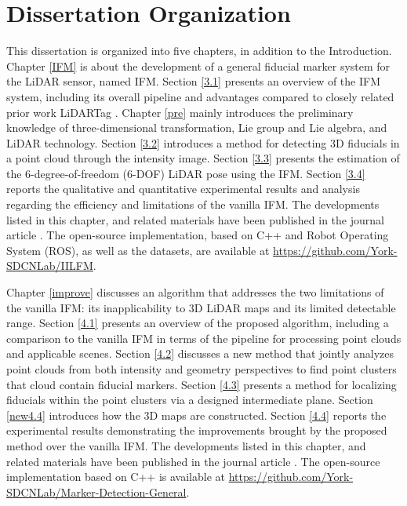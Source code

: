 \section{Dissertation Organization}
This dissertation is organized into five chapters, in addition to the Introduction.
%
Chapter \ref{IFM} is about the development of a general fiducial marker system for the LiDAR sensor, named IFM. Section \ref{3.1} presents an overview of the IFM system, including its overall pipeline and advantages compared to closely related prior work LiDARTag \cite{lt}. Chapter \ref{pre} mainly introduces the preliminary knowledge of three-dimensional transformation, Lie group and Lie algebra, and LiDAR technology. Section \ref{3.2} introduces a method for detecting 3D fiducials in a point cloud through the intensity image. Section \ref{3.3} presents the estimation of the 6-degree-of-freedom (6-DOF) LiDAR pose using the IFM. Section \ref{3.4} reports the qualitative and quantitative experimental results and analysis regarding the efficiency and limitations of the vanilla IFM. The developments listed in this chapter, and related materials have been published in the journal article \cite{iilfm}. The open-source implementation, based on C++ and Robot Operating System (ROS), as well as the datasets, are available at \url{https://github.com/York-SDCNLab/IILFM}.
\par
Chapter \ref{improve} discusses an algorithm that addresses the two limitations of the vanilla IFM: its inapplicability to 3D LiDAR maps and its limited detectable range. Section \ref{4.1} presents an overview of the proposed algorithm, including a comparison to the vanilla IFM in terms of the pipeline for processing point clouds and applicable scenes. Section \ref{4.2} discusses a new method that jointly analyzes point clouds from both intensity and geometry perspectives to find point clusters that cloud contain fiducial markers.
Section \ref{4.3} presents a method for localizing fiducials within the point clusters via a designed intermediate plane. Section \ref{new4.4} introduces how the 3D maps are constructed. Section \ref{4.4} reports the experimental results demonstrating the improvements brought by the proposed method over the vanilla IFM. The developments listed in this chapter, and related materials have been published in the journal article \cite{access}. The open-source implementation based on C++ is available at \url{https://github.com/York-SDCNLab/Marker-Detection-General}.
